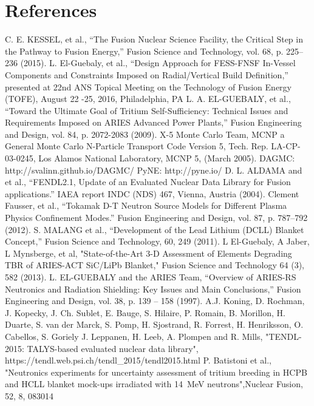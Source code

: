 \documentclass[12pt, letterpaper]{elsarticle}
\begin{document}
\newpage
\section{References}
\begin{thebibliography}{14} 
C. E. KESSEL, et al., {“The Fusion Nuclear Science Facility, the Critical Step in the Pathway to Fusion Energy,” Fusion Science and Technology, vol. 68, p. 225–236 (2015).}
  L. El-Guebaly, et al., {“Design Approach for FESS-FNSF In-Vessel Components and Constraints Imposed on Radial/Vertical Build Definition,” presented at 22nd ANS Topical Meeting on the Technology of Fusion Energy (TOFE), August 22 -25, 2016, Philadelphia, PA}
L. A. EL-GUEBALY, et al., {“Toward the Ultimate Goal of Tritium Self-Sufficiency: Technical Issues and Requirements Imposed on ARIES Advanced Power Plants,” Fusion Engineering and Design, vol. 84, p. 2072-2083 (2009).}
X-5 Monte Carlo Team, {MCNP a General Monte Carlo N-Particle Transport Code Version 5, Tech. Rep. LA-CP-03-0245, Los Alamos National Laboratory, MCNP 5, (March 2005).}
{DAGMC: http://svalinn.github.io/DAGMC/}
{PyNE: http://pyne.io/} 
D. L. ALDAMA and et al., {“FENDL2.1, Update of an Evaluated Nuclear Data Library for Fusion applications.” IAEA report INDC (NDS) 467, Vienna, Austria (2004).}
Clement Fausser, et al., {“Tokamak D-T Neutron Source Models for Different Plasma Physics Confinement Modes.” Fusion Engineering and Design, vol. 87, p. 787–792 (2012).}
S. MALANG et al., {“Development of the Lead Lithium (DCLL) Blanket Concept,” Fusion Science and Technology, 60, 249 (2011).}
  L El-Guebaly, A Jaber, L Mynsberge, et al, {"State-of-the-Art 3-D Assessment of Elements Degrading TBR of ARIES-ACT SiC/LiPb Blanket," Fusion Science and Technology 64 (3), 582 (2013).}
  L. EL-GUEBALY and the ARIES Team, {“Overview of ARIES-RS Neutronics and Radiation Shielding: Key Issues and Main Conclusions,” Fusion Engineering and Design, vol. 38, p. 139 – 158 (1997).}
A.J. Koning, D. Rochman, J. Kopecky, J. Ch. Sublet, E. Bauge, S. Hilaire, P. Romain, B. Morillon, H. Duarte, S. van der Marck, S. Pomp, H. Sjostrand, R. Forrest, H. Henriksson, O. Cabellos, S. Goriely J. Leppanen, H. Leeb, A. Plompen and R. Mills, {"TENDL-2015: TALYS-based evaluated nuclear data library",  https://tendl.web.psi.ch/tendl\_2015/tendl2015.html}
P. Batistoni et al., {{"Neutronics experiments for uncertainty assessment of tritium breeding in HCPB and HCLL blanket mock-ups irradiated with 14 MeV neutrons"},Nuclear Fusion, 52, 8, 083014}
\end{thebibliography}
\end{document}
